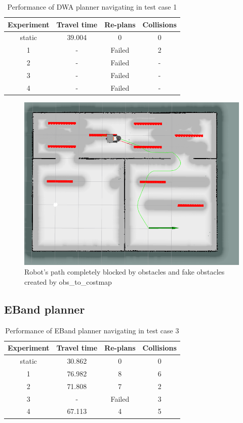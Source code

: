 \begin{table}[H]
    \centering
    \begin{tabular}{cccc}
        \textbf{Experiment} & \textbf{Travel time} & \textbf{Re-plans} & \textbf{Collisions} \\\toprule
        static & 39.004 & 0 & 0 \\
             1 & \-- & Failed & 2 \\
             2 & \-- & Failed & \-- \\
             3 & \-- & Failed & \-- \\
             4 & \-- & Failed & \-- \\
    \end{tabular}
    \caption{Performance of DWA planner navigating in test case 1}\label{tab:perfomance_dwa_test_case_3}
\end{table}

\begin{figure}[H]
    \centering
    \includegraphics[width=0.5\linewidth]{images/dwa_double/1/fail.png}
    \caption{\label{fig:blocked_planner_in_corridor} Robot's path completely blocked by obstacles and 
        fake obstacles created by obs\_to\_costmap}
\end{figure}

\subsection{EBand planner}%
\label{sub:eval_eband_planner_tc3}

\begin{table}[H]
    \centering
    \begin{tabular}{cccc}
        \textbf{Experiment} & \textbf{Travel time} & \textbf{Re-plans} & \textbf{Collisions} \\\toprule
        static & 30.862 & 0 & 0 \\
             1 & 76.982 & 8 & 6 \\
             2 & 71.808 & 7 & 2 \\
             3 & \-- & Failed & 3 \\
             4 & 67.113 & 4 & 5 \\
    \end{tabular}
    \caption{Performance of EBand planner navigating in test case 3}\label{tab:perfomance_eband_test_case_3}
\end{table}



